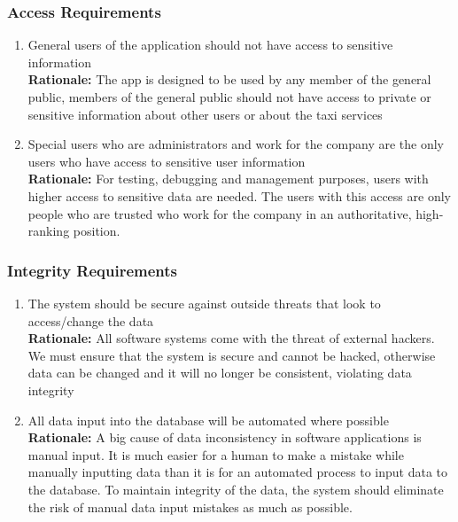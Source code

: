 \documentclass[]{article}
\begin{document}
\subsubsection{Access Requirements}
\label{ssub:access_requirements}
\begin{enumerate}[{SR-AC}1. ]
	\item General users of the application should not have access to sensitive information \\
	{\bf Rationale:} The app is designed to be used by any member of the general public, members of the general public should not have access to private or sensitive information about other users or about the taxi services 
	\item Special users who are administrators and work for the company are the only users who have access to sensitive user information \\
	{\bf Rationale:} For testing, debugging and management purposes, users with higher access to sensitive data are needed. The users with this access are only people who are trusted who work for the company in an authoritative, high-ranking position.
\end{enumerate}

\subsubsection{Integrity Requirements}
\label{ssub:integrity_requirements}
\begin{enumerate}[{SR-INT}1. ]
	\item The system should be secure against outside threats that look to access/change the data \\
	{\bf Rationale:} All software systems come with the threat of external hackers. We must ensure that the system is secure and cannot be hacked, otherwise data can be changed and it will no longer be consistent, violating data integrity 
	\item All data input into the database will be automated where possible \\
	{\bf Rationale:} A big cause of data inconsistency in software applications is manual input. It is much easier for a human to make a mistake while manually inputting data than it is for an automated process to input data to the database. To maintain integrity of the data, the system should eliminate the risk of manual data input mistakes as much as possible.
\end{enumerate}
\end{document}
